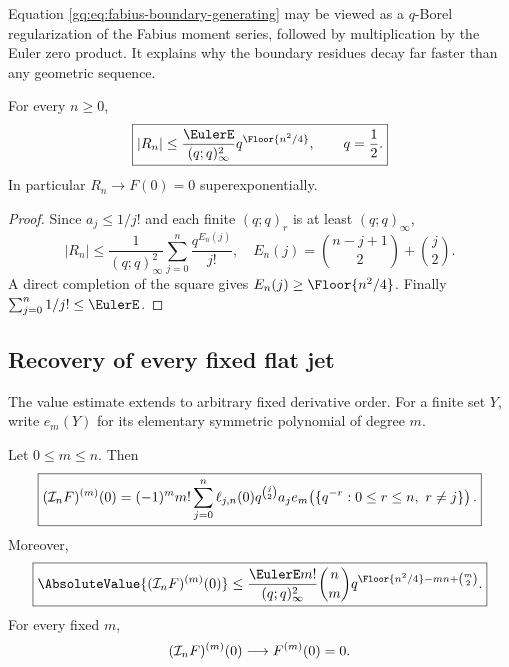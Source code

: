 Equation \eqref{gq:eq:fabius-boundary-generating} may be viewed as a
$q$-Borel regularization of the Fabius moment series, followed by
multiplication by the Euler zero product.  It explains why the boundary
residues decay far faster than any geometric sequence.

\begin{theorem}
\label{gq:thm:fabius-boundary-bound}
For every $n\ge0$,
\begin{equation}
 \boxed{
 |R_n|\le
 \frac{\EulerE}{(q;q)_\infty^2}
 q^{\Floor{n^2/4}},
 \qquad q=\frac12.}
 \label{gq:eq:fabius-boundary-bound}
\end{equation}
In particular $R_n\to F(0)=0$ superexponentially.
\end{theorem}

\begin{proof}
Since $a_j\le1/j!$ and each finite $(q;q)_r$ is at least
$(q;q)_\infty$,
\[
 |R_n|\le\frac1{(q;q)_\infty^2}
 \sum_{j=0}^{n}\frac{q^{E_n(j)}}{j!},
 \quad
 E_n(j)=\binom{n-j+1}{2}+\binom j2.
\]
A direct completion of the square gives
$E_n(j)\ge\Floor{n^2/4}$.  Finally
$\sum_{j=0}^n1/j!\le\EulerE$.
\end{proof}

\subsection{Recovery of every fixed flat jet}

The value estimate extends to arbitrary fixed derivative order.  For a
finite set $Y$, write $e_m(Y)$ for its elementary symmetric polynomial of
degree $m$.

\begin{theorem}
\label{gq:thm:fabius-fixed-jets}
Let $0\le m\le n$.  Then
\begin{equation}
 \boxed{
 (\mathcal I_nF)^{(m)}(0)
 =(-1)^mm!\sum_{j=0}^{n}
 \ell_{j,n}(0)q^{\binom j2}a_j
 e_m\!\left(\{q^{-r}:0\le r\le n,\ r\ne j\}\right).}
 \label{gq:eq:fabius-jet-exact}
\end{equation}
Moreover,
\begin{equation}
 \boxed{
 \AbsoluteValue{(\Interp_nF)^{(m)}(0)}
 \le \frac{\EulerE m!}{(q;q)_\infty^2}
 \binom nm
 q^{\Floor{n^2/4}-mn+\binom m2}.}
 \label{gq:eq:fabius-jet-bound}
\end{equation}
For every fixed $m$,
\begin{equation}
 (\mathcal I_nF)^{(m)}(0)\longrightarrow F^{(m)}(0)=0.
 \label{gq:eq:fabius-fixed-jet-convergence}
\end{equation}
\end{theorem}

